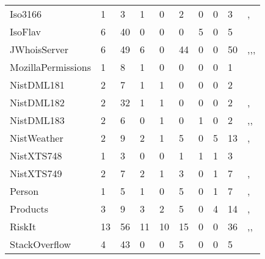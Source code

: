 \begin{table*}[t]
\begin{tabular}{llllllllll}
Iso3166      & 1 &  3     &      1       &    0         &    2      &    0    &  0     & 3 &  \cite{mcminn2016virtual},\cite{kapfhammer2013search}\\
IsoFlav & 6 & 40          &        0     &      0       &   0       &    5    &   0    & 5 & \cite{wright2014impact} \\
JWhoisServer & 6 & 49     &      6       &    0         &  44       &    0    &    0   & 50 &  \cite{mcminn2016virtual},\cite{kapfhammer2013search},\cite{wright2013efficient},\cite{wright2014impact}\\
MozillaPermissions& 1 & 8 &     1        &   0          &     0     &    0    &     0  & 1  &  \cite{mcminn2016virtual}\\
NistDML181 & 2 & 7        &     1        &      1       &    0      &    0    &   0    & 2 & \cite{kapfhammer2013search}  \\
NistDML182 & 2 & 32       &     1        &      1       &    0      &    0    &   0    & 2 & \cite{kapfhammer2013search},\cite{wright2013efficient}  \\
NistDML183 & 2 &   6      &     0        &      1       &    0      &    1    &   0    & 2 & \cite{kapfhammer2013search},\cite{wright2013efficient},\cite{wright2014impact}  \\
NistWeather  & 2 & 9      &    2         &         1    &     5     &    0    &   5    & 13 &  \cite{mcminn2016virtual},\cite{kapfhammer2013search}\\
NistXTS748 & 1 & 3        &     0        &       0      &    1      &    1    &    1   & 3 &  \cite{kapfhammer2013search} \\
NistXTS749 & 2 & 7        &     2        &       1      &    3      &    0    &    1   & 7 &  \cite{kapfhammer2013search},\cite{wright2014impact} \\
Person       & 1 & 5      &     1        &       0      &    5      &    0    &   1    & 7 &  \cite{mcminn2016virtual},\cite{kapfhammer2013search}\\
Products     & 3 & 9      &        3     &      2       &    5      &   0     &  4     & 14 &   \cite{mcminn2016virtual},\cite{kapfhammer2013search}\\
RiskIt & 13  & 56         &     11       &    10        &    15     &    0    &   0    & 36 &  \cite{kapfhammer2013search},\cite{wright2013efficient},\cite{wright2014impact} \\
StackOverflow &  4  & 43  &      0       &        0     &     5     &    0    &  0     & 5 & \cite{wright2014impact} \\

\end{tabular}
\end{table*}
